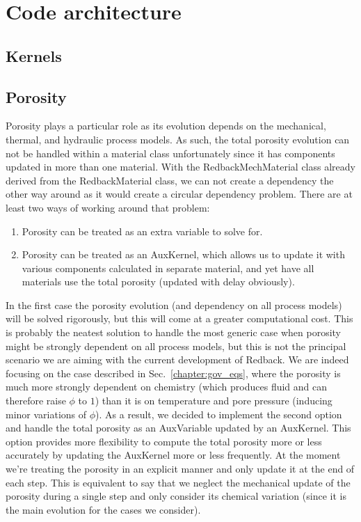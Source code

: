 \documentclass[]{scrreprt}
\begin{document}
\nocite{*}


\chapter{Code architecture}
\section{Kernels}
\section{Porosity}
Porosity plays a particular role as its evolution depends on the mechanical, thermal, and hydraulic process models. As such, the total porosity evolution can not be handled within a material class unfortunately since it has components updated in more than one material. With the RedbackMechMaterial class already derived from the RedbackMaterial class, we can not create a dependency the other way around as it would create a circular dependency problem. There are at least two ways of working around that problem:
\begin{enumerate}
\item Porosity can be treated as an extra variable to solve for. 
\item Porosity can be treated as an AuxKernel, which allows us to update it with various components calculated in separate material, and yet have all materials use the total porosity (updated with delay obviously).
\end{enumerate}
In the first case the porosity evolution (and dependency on all process models) will be solved rigorously, but this will come at a greater computational cost. This is probably the neatest solution to handle the most generic case when porosity might be strongly dependent on all process models, but this is not the principal scenario we are aiming with the current development of Redback. We are indeed focusing on the case described in Sec.~\ref{chapter:gov_eqs}, where the porosity is much more strongly dependent on chemistry (which produces fluid and can therefore raise $\phi$ to $1$) than it is on temperature and pore pressure (inducing minor variations of $\phi$). As a result, we decided to implement the second option and handle the total porosity as an AuxVariable updated by an AuxKernel. This option provides more flexibility to compute the total porosity more or less accurately by updating the AuxKernel more or less frequently. At the moment we're treating the porosity in an explicit manner and only update it at the end of each step. This is equivalent to say that we neglect the mechanical update of the porosity during a single step and only consider its chemical variation (since it is the main evolution for the cases we consider).
\end{document}
